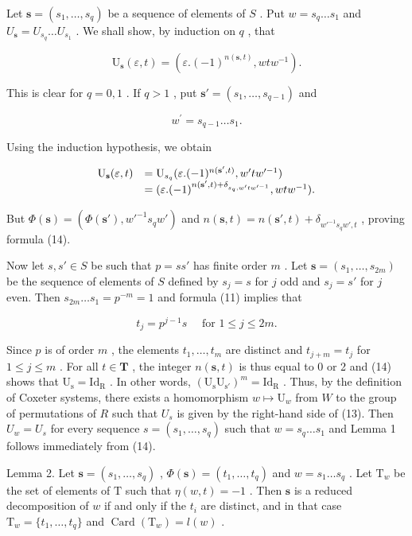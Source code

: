 Let \(\mathbf{s} = (s_1, \ldots, s_q)\) be a sequence of elements of \(S\) . Put \(w = s_q \ldots s_1\) and \(U_{\mathbf{s}} = U_{s_q} \ldots U_{s_1}\) . We shall show, by induction on \(q\) , that

\[
\mathrm{U} _ {\mathbf {s}} (\varepsilon , t) = (\varepsilon . (- 1) ^ {n (\mathbf {s}, t)}, w t w ^ {- 1}).\tag{14}
\]

This is clear for \(q = 0,1\) . If \(q > 1\) , put \(\mathbf{s}' = (s_1,\dots ,s_{q - 1})\) and

\[
w ^ {\prime} = s _ {q - 1} \dots s _ {1}.
\]

Using the induction hypothesis, we obtain

\[
\begin{array}{r l} \mathrm{U} _ {\mathbf {s}} (\varepsilon , t) & = \mathrm{U} _ {s _ {q}} (\varepsilon . (- 1) ^ {n (\mathbf {s} ^ {\prime}, t)}, w ^ {\prime} t w ^ {\prime - 1}) \\ & = (\varepsilon . (- 1) ^ {n (\mathbf {s} ^ {\prime}, t) + \delta_ {s _ {q}, w ^ {\prime} t w ^ {\prime - 1}}}, w t w ^ {- 1}). \end{array}
\]

But \(\Phi(\mathbf{s}) = (\Phi(\mathbf{s}'), w'^{-1}s_q w')\) and \(n(\mathbf{s}, t) = n(\mathbf{s}', t) + \delta_{w'^{-1}s_q w', t}\) , proving formula (14).

Now let \(s, s' \in S\) be such that \(p = ss'\) has finite order \(m\) . Let \(\mathbf{s} = (s_1, \ldots, s_{2m})\) be the sequence of elements of \(S\) defined by \(s_j = s\) for \(j\) odd and \(s_j = s'\) for \(j\) even. Then \(s_{2m} \ldots s_1 = p^{-m} = 1\) and formula (11) implies that

\[
t _ {j} = p ^ {j - 1} s \quad \text { for } 1 \leqslant j \leqslant 2 m.\tag{15}
\]

Since \(p\) is of order \(m\) , the elements \(t_1, \ldots, t_m\) are distinct and \(t_{j+m} = t_j\) for \(1 \leqslant j \leqslant m\) . For all \(t \in \mathbf{T}\) , the integer \(n(\mathbf{s}, t)\) is thus equal to 0 or 2 and (14) shows that \(\mathrm{U_s} = \mathrm{Id_R}\) . In other words, \((\mathrm{U_sU_{s'}})^m = \mathrm{Id_R}\) . Thus, by the definition of Coxeter systems, there exists a homomorphism \(w \mapsto \mathrm{U}_w\) from \(W\) to the group of permutations of \(R\) such that \(U_s\) is given by the right-hand side of (13). Then \(U_w = U_s\) for every sequence \(s = (s_1, \ldots, s_q)\) such that \(w = s_q \ldots s_1\) and Lemma 1 follows immediately from (14).

Lemma 2. Let \(\mathbf{s} = (s_1, \ldots, s_q)\) , \(\Phi(\mathbf{s}) = (t_1, \ldots, t_q)\) and \(w = s_1 \ldots s_q\) . Let \(\mathrm{T}_w\) be the set of elements of \(\mathrm{T}\) such that \(\eta(w, t) = -1\) . Then \(\mathbf{s}\) is a reduced decomposition of \(w\) if and only if the \(t_i\) are distinct, and in that case \(\mathrm{T}_w = \{t_1, \ldots, t_q\}\) and \(\operatorname{Card}(\mathrm{T}_w) = l(w)\) .

